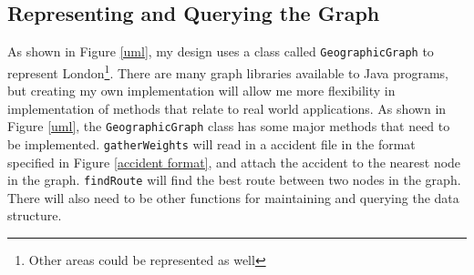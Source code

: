 \documentclass[11pt,twoside,a4paper]{report}
\begin{document}
\subsection{Representing and Querying the Graph}
As shown in Figure \ref{uml}, my design uses a class called \texttt{GeographicGraph} to represent London\footnote{Other areas could be represented as well}. There are many graph libraries available to Java programs, but creating my own implementation
 will allow me more flexibility in implementation of methods that relate to real world applications. As shown in Figure \ref{uml}, the \texttt{GeographicGraph} class has some major methods that need to be implemented. \texttt{gatherWeights} will 
 read in a accident file in the format specified in Figure \ref{accident format}, and attach the accident to the nearest node in the graph. \texttt{findRoute} will find the best route between two nodes in the graph.
There will also need to be other functions for maintaining and querying the data structure.
\end{document}
